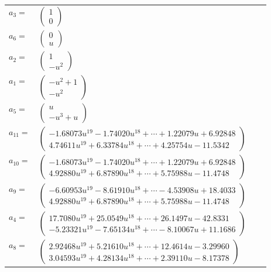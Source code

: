 \documentclass[1p]{elsarticle_modified}
\theoremstyle{definition}
\begin{document}
\begin{tabular}{m{7pt} m{180pt} m{7pt} m{180pt} }
\flushright $a_{3}=$&$\begin{pmatrix}1\\0\end{pmatrix}$ \\
\flushright $a_{6}=$&$\begin{pmatrix}0\\u\end{pmatrix}$ \\
\flushright $a_{2}=$&$\begin{pmatrix}1\\- u^2\end{pmatrix}$ \\
\flushright $a_{1}=$&$\begin{pmatrix}- u^2+1\\- u^2\end{pmatrix}$ \\
\flushright $a_{5}=$&$\begin{pmatrix}u\\- u^3+u\end{pmatrix}$ \\
\flushright $a_{11}=$&$\begin{pmatrix}-1.68073 u^{19}-1.74020 u^{18}+\cdots+1.22079 u+6.92848\\4.74611 u^{19}+6.33784 u^{18}+\cdots+4.25754 u-11.5342\end{pmatrix}$ \\
\flushright $a_{10}=$&$\begin{pmatrix}-1.68073 u^{19}-1.74020 u^{18}+\cdots+1.22079 u+6.92848\\4.92880 u^{19}+6.87890 u^{18}+\cdots+5.75988 u-11.4748\end{pmatrix}$ \\
\flushright $a_{9}=$&$\begin{pmatrix}-6.60953 u^{19}-8.61910 u^{18}+\cdots-4.53908 u+18.4033\\4.92880 u^{19}+6.87890 u^{18}+\cdots+5.75988 u-11.4748\end{pmatrix}$ \\
\flushright $a_{4}=$&$\begin{pmatrix}17.7080 u^{19}+25.0549 u^{18}+\cdots+26.1497 u-42.8331\\-5.23321 u^{19}-7.65134 u^{18}+\cdots-8.10067 u+11.1686\end{pmatrix}$ \\
\flushright $a_{8}=$&$\begin{pmatrix}2.92468 u^{19}+5.21610 u^{18}+\cdots+12.4614 u-3.29960\\3.04593 u^{19}+4.28134 u^{18}+\cdots+2.39110 u-8.17378\end{pmatrix}$ \\

\end{tabular}
\end{document}
